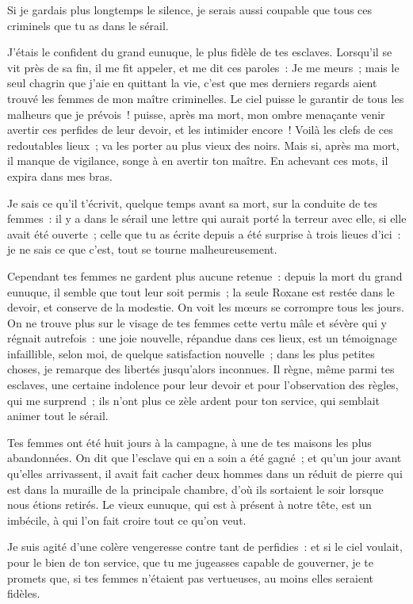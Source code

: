 \documentclass[french,twoside]{book} %
\begin{document}
\noindent Si je gardais plus longtemps le silence, je serais aussi coupable que tous ces criminels que tu as dans le sérail.\par
J’étais le confident du grand eunuque, le plus fidèle de tes esclaves. Lorsqu’il se vit près de sa fin, il me fit appeler, et me dit ces paroles : Je me meurs ; mais le seul chagrin que j’aie en quittant la vie, c’est que mes derniers regards aient trouvé les femmes de mon maître criminelles. Le ciel puisse le garantir de tous les malheurs que je prévois ! puisse, après ma mort, mon ombre menaçante venir avertir ces perfides de leur devoir, et les intimider encore ! Voilà les clefs de ces redoutables lieux ; va les porter au plus vieux des noirs. Mais si, après ma mort, il manque de vigilance, songe à en avertir ton maître. En achevant ces mots, il expira dans mes bras.\par
Je sais ce qu’il t’écrivit, quelque temps avant sa mort, sur la conduite de tes femmes : il y a dans le sérail une lettre qui aurait porté la terreur avec elle, si elle avait été ouverte ; celle que tu as écrite depuis a été surprise à trois lieues d’ici : je ne sais ce que c’est, tout se tourne malheureusement.\par
Cependant tes femmes ne gardent plus aucune retenue : depuis la mort du grand eunuque, il semble que tout leur soit permis ; la seule Roxane est restée dans le devoir, et conserve de la modestie. On voit les mœurs se corrompre tous les jours. On ne trouve plus sur le visage de tes femmes cette vertu mâle et sévère qui y régnait autrefois : une joie nouvelle, répandue dans ces lieux, est un témoignage infaillible, selon moi, de quelque satisfaction nouvelle ; dans les plus petites choses, je remarque des libertés jusqu’alors inconnues. Il règne, même parmi tes esclaves, une certaine indolence pour leur devoir et pour l’observation des règles, qui me surprend ; ils n’ont plus ce zèle ardent pour ton service, qui semblait animer tout le sérail.\par
Tes femmes ont été huit jours à la campagne, à une de tes maisons les plus abandonnées. On dit que l’esclave qui en a soin a été gagné ; et qu’un jour avant qu’elles arrivassent, il avait fait cacher deux hommes dans un réduit de pierre qui est dans la muraille de la principale chambre, d’où ils sortaient le soir lorsque nous étions retirés. Le vieux eunuque, qui est à présent à notre tête, est un imbécile, à qui l’on fait croire tout ce qu’on veut.\par
Je suis agité d’une colère vengeresse contre tant de perfidies : et si le ciel voulait, pour le bien de ton service, que tu me jugeasses capable de gouverner, je te promets que, si tes femmes n’étaient pas vertueuses, au moins elles seraient fidèles.\par
\end{document}
